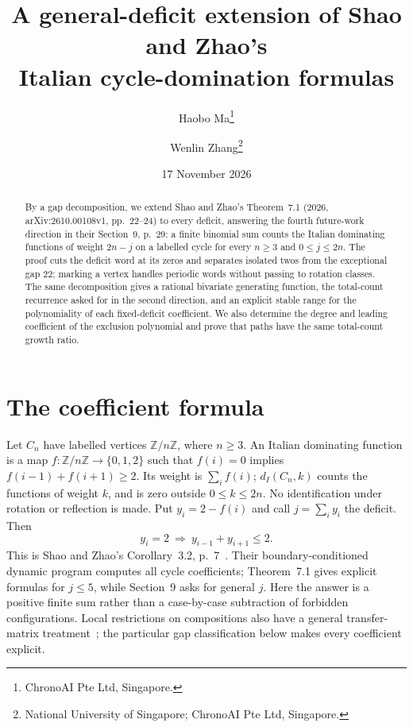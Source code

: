 \documentclass[11pt]{article}
\title{A general-deficit extension of Shao and Zhao's\\Italian cycle-domination formulas}
\author{Haobo Ma\thanks{ChronoAI Pte Ltd, Singapore.}\and
Wenlin Zhang\thanks{National University of Singapore; ChronoAI Pte Ltd, Singapore.}}
\date{17 November 2026}
\newcommand{\di}{d_I}
\newcommand{\Z}{\mathbb Z}
\begin{document}
\maketitle
\begin{abstract}
By a gap decomposition, we extend Shao and Zhao's Theorem~7.1 (2026, arXiv:\allowbreak2610.00108v1,
pp.~22--24) to every deficit, answering the fourth future-work direction
in their Section~9, p.~29: a finite binomial sum counts the Italian
dominating functions of weight $2n-j$ on a labelled cycle for every
$n\geq3$ and $0\leq j\leq2n$.
The proof cuts the deficit word at its zeros and separates isolated twos
from the exceptional gap $22$; marking a vertex handles periodic words
without passing to rotation classes.
The same decomposition gives a rational bivariate generating function,
the total-count recurrence asked for in the second direction, and an
explicit stable range for the polynomiality of each fixed-deficit coefficient.
We also determine the degree and leading coefficient of the exclusion
polynomial and prove that paths have the same total-count growth ratio.
\end{abstract}

\section{The coefficient formula}
Let $C_n$ have labelled vertices $\Z/n\Z$, where $n\geq3$.
An Italian dominating function is a map $f:\Z/n\Z\to\{0,1,2\}$ such that
$f(i)=0$ implies $f(i-1)+f(i+1)\geq2$. Its weight is $\sum_i f(i)$;
$\di(C_n,k)$ counts the functions of weight $k$, and is zero outside
$0\leq k\leq2n$. No identification under rotation or reflection is made.
Put $y_i=2-f(i)$ and call $j=\sum_i y_i$ the deficit. Then
\begin{equation}\label{eq:local}
 y_i=2\ \Longrightarrow\ y_{i-1}+y_{i+1}\leq2.
\end{equation}
This is Shao and Zhao's Corollary~3.2, p.~7~\cite{SZ}.
Their boundary-conditioned dynamic program computes all cycle coefficients;
Theorem~7.1 gives explicit formulas for $j\leq5$, while Section~9 asks for
general $j$. Here the answer is a positive finite sum rather than a
case-by-case subtraction of forbidden configurations. Local restrictions
on compositions also have a general transfer-matrix treatment~\cite{BC};
the particular gap classification below makes every coefficient explicit.
\end{document}
